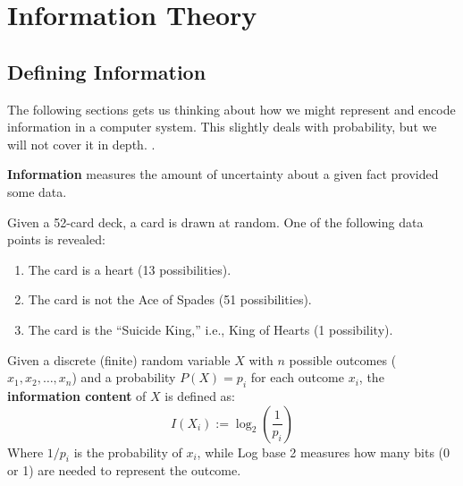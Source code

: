\section{Information Theory}
\subsection{Defining Information}

\noindent
 The following sections gets us thinking about how we might represent and encode information in a computer system.
 This slightly deals with probability, but we will not cover it in depth.
 \cite{terman2017computation_structures}.

\begin{Def}[Information]

    \label{def:info}

    \textbf{Information} measures the amount of uncertainty about a given fact provided some data.
\end{Def}

\begin{Example}

    \label{ex:card_info}

    Given a 52-card deck, a card is drawn at random. One of the following data points is revealed:
    \renewcommand{\labelenumi}{\alph{enumi})}
    \begin{enumerate}
        \item The card is a heart (13 possibilities).
        \item The card is not the Ace of Spades (51 possibilities).
        \item The card is the ``Suicide King,'' i.e., King of Hearts (1 possibility).
    \end{enumerate}

    \vspace{-1.5em}
\end{Example}

\begin{Def}

    \label{def:quant_info}

    Given a discrete (finite) random variable $X$ with $n$ possible outcomes ($x_1, x_2, \ldots, x_n$) and a probability $P(X) = p_i$ for each outcome $x_i$, the \textbf{information content} of $X$ is defined as:
    \[
    I(X_i) := \log_2\left(\dfrac{1}{p_i}\right)
    \]
    \noindent
    Where $1/p_i$ is the probability of $x_i$, while Log base 2 measures how many bits (0 or 1) are needed to represent the outcome.
\end{Def}

